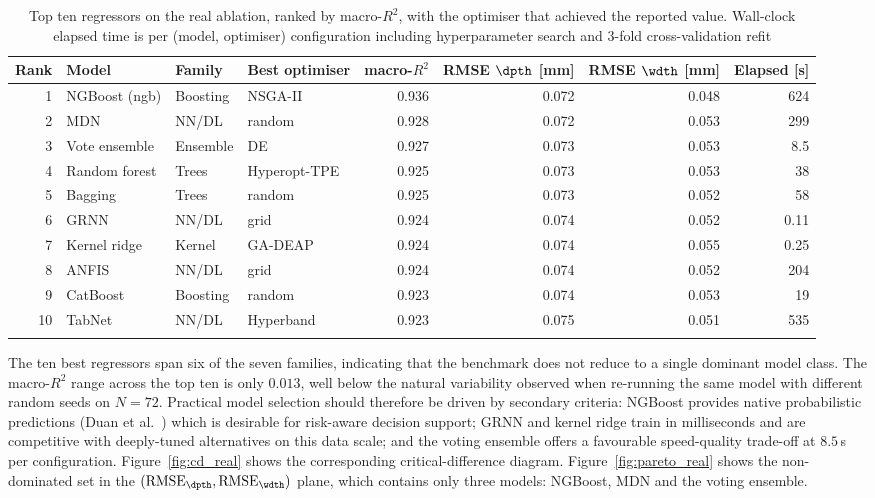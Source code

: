 \begin{table}[h]
\caption{Top ten regressors on the real ablation, ranked by macro-$R^{2}$, with the optimiser that achieved the reported value. Wall-clock elapsed time is per (model, optimiser) configuration including hyperparameter search and 3-fold cross-validation refit}\label{tab:top10_real}%
\begin{tabular}{@{}rlllrrrr@{}}
\toprule
Rank & Model & Family & Best optimiser & macro-$R^{2}$ & RMSE $\dpth$ [\si{\mm}] & RMSE $\wdth$ [\si{\mm}] & Elapsed [\si{\second}] \\
\midrule
 1 & NGBoost (ngb)  & Boosting & NSGA-II        & 0.936 & 0.072 & 0.048 & 624   \\
 2 & MDN            & NN/DL    & random         & 0.928 & 0.072 & 0.053 & 299   \\
 3 & Vote ensemble  & Ensemble & DE             & 0.927 & 0.073 & 0.053 & 8.5   \\
 4 & Random forest  & Trees    & Hyperopt-TPE   & 0.925 & 0.073 & 0.053 & 38    \\
 5 & Bagging        & Trees    & random         & 0.925 & 0.073 & 0.052 & 58    \\
 6 & GRNN           & NN/DL    & grid           & 0.924 & 0.074 & 0.052 & 0.11  \\
 7 & Kernel ridge   & Kernel   & GA-DEAP        & 0.924 & 0.074 & 0.055 & 0.25  \\
 8 & ANFIS          & NN/DL    & grid           & 0.924 & 0.074 & 0.052 & 204   \\
 9 & CatBoost       & Boosting & random         & 0.923 & 0.074 & 0.053 & 19    \\
 10 & TabNet        & NN/DL    & Hyperband      & 0.923 & 0.075 & 0.051 & 535   \\
\botrule
\end{tabular}
\end{table}

The ten best regressors span six of the seven families, indicating that the benchmark does not reduce to a single dominant model class. The macro-$R^{2}$ range across the top ten is only $0.013$, well below the natural variability observed when re-running the same model with different random seeds on $N = 72$. Practical model selection should therefore be driven by secondary criteria: NGBoost provides native probabilistic predictions (Duan et al.~\cite{duan2020ngboost}) which is desirable for risk-aware decision support; GRNN and kernel ridge train in milliseconds and are competitive with deeply-tuned alternatives on this data scale; and the voting ensemble offers a favourable speed-quality trade-off at $8.5$\,\si{\second} per configuration. Figure~\ref{fig:cd_real} shows the corresponding critical-difference diagram. Figure~\ref{fig:pareto_real} shows the non-dominated set in the $(\mathrm{RMSE}_{\dpth},\mathrm{RMSE}_{\wdth})$ plane, which contains only three models: NGBoost, MDN and the voting ensemble.

